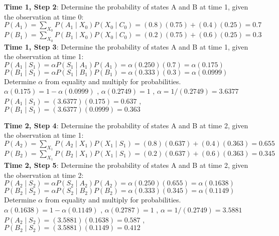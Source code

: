 \documentclass[fleqn]{hw8}
\begin{document}
\begin{enumerate}
\textbf{Time 1, Step 2}: Determine the probability of states A and B at time 1, given the observation at time 0: \\
$\displaystyle P(A_1) = \sum_{X_0} P(A_1 \mid X_0)P(X_0 \mid C_0) = (0.8)(0.75) + (0.4)(0.25) = 0.7 $ \\
$\displaystyle P(B_1) = \sum_{X_0} P(B_1 \mid X_0)P(X_0 \mid C_0) = (0.2)(0.75) + (0.6)(0.25) = 0.3 $ \\

\textbf{Time 1, Step 3}: Determine the probability of states A and B at time 1, given the observation at time 1: \\
$\displaystyle P(A_1 \mid S_1) = \alpha P(S_1 \mid A_1)P(A_1) = \alpha (0.250)(0.7) = \alpha (0.175) $ \\
$\displaystyle P(B_1 \mid S_1) = \alpha P(S_1 \mid B_1)P(B_1) = \alpha (0.333)(0.3) = \alpha (0.0999) $ \\
Determine $\alpha$ from equality and multiply for probabilities.\\
$\alpha (0.175) = 1 - \alpha (0.0999) $ , $\alpha (0.2749) = 1 $ , $\alpha = 1/(0.2749) = 3.6377 $ \\
$P(A_1 \mid S_1) = (3.6377)(0.175) = \mathbf{0.637} $ , $P(B_1 \mid S_1) = (3.6377)(0.0999) = \mathbf{0.363}$

\textbf{Time 2, Step 4}: Determine the probability of states A and B at time 2, given the observation at time 1: \\
$\displaystyle P(A_2) = \sum_{X_1} P(A_2 \mid X_1)P(X_1 \mid S_1) = (0.8)(0.637) + (0.4)(0.363) = 0.655 $ \\
$\displaystyle P(B_2) = \sum_{X_1} P(B_2 \mid X_1)P(X_1 \mid S_1) = (0.2)(0.637) + (0.6)(0.363) = 0.345 $ \\

\textbf{Time 2, Step 5}: Determine the probability of states A and B at time 2, given the observation at time 2: \\
$\displaystyle P(A_2 \mid S_2) = \alpha P(S_2 \mid A_2)P(A_2) = \alpha (0.250)(0.655) = \alpha (0.1638) $ \\
$\displaystyle P(B_2 \mid S_2) = \alpha P(S_2 \mid B_2)P(B_2) = \alpha (0.333)(0.345) = \alpha (0.1149) $ \\
Determine $\alpha$ from equality and multiply for probabilities.\\
$\alpha (0.1638) = 1 - \alpha (0.1149) $ , $\alpha (0.2787) = 1 $ , $\alpha = 1/(0.2749) = 3.5881 $ \\
$P(A_2 \mid S_2) = (3.5881)(0.1638) = \mathbf{0.587} $ , $P(B_2 \mid S_2) = (3.5881)(0.1149) = \mathbf{0.412}$


\end{enumerate}
\end{document}
